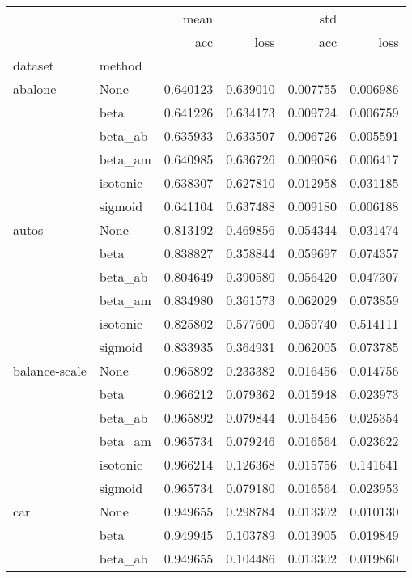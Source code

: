 \begin{tabular}{llrrrr}
\toprule
        &      &      mean &           &       std &           \\
        &      &       acc &      loss &       acc &      loss \\
dataset & method &           &           &           &           \\
\midrule
abalone & None &  0.640123 &  0.639010 &  0.007755 &  0.006986 \\
        & beta &  0.641226 &  0.634173 &  0.009724 &  0.006759 \\
        & beta\_ab &  0.635933 &  0.633507 &  0.006726 &  0.005591 \\
        & beta\_am &  0.640985 &  0.636726 &  0.009086 &  0.006417 \\
        & isotonic &  0.638307 &  0.627810 &  0.012958 &  0.031185 \\
        & sigmoid &  0.641104 &  0.637488 &  0.009180 &  0.006188 \\
autos & None &  0.813192 &  0.469856 &  0.054344 &  0.031474 \\
        & beta &  0.838827 &  0.358844 &  0.059697 &  0.074357 \\
        & beta\_ab &  0.804649 &  0.390580 &  0.056420 &  0.047307 \\
        & beta\_am &  0.834980 &  0.361573 &  0.062029 &  0.073859 \\
        & isotonic &  0.825802 &  0.577600 &  0.059740 &  0.514111 \\
        & sigmoid &  0.833935 &  0.364931 &  0.062005 &  0.073785 \\
balance-scale & None &  0.965892 &  0.233382 &  0.016456 &  0.014756 \\
        & beta &  0.966212 &  0.079362 &  0.015948 &  0.023973 \\
        & beta\_ab &  0.965892 &  0.079844 &  0.016456 &  0.025354 \\
        & beta\_am &  0.965734 &  0.079246 &  0.016564 &  0.023622 \\
        & isotonic &  0.966214 &  0.126368 &  0.015756 &  0.141641 \\
        & sigmoid &  0.965734 &  0.079180 &  0.016564 &  0.023953 \\
car & None &  0.949655 &  0.298784 &  0.013302 &  0.010130 \\
        & beta &  0.949945 &  0.103789 &  0.013905 &  0.019849 \\
        & beta\_ab &  0.949655 &  0.104486 &  0.013302 &  0.019860 \\

\end{tabular}
